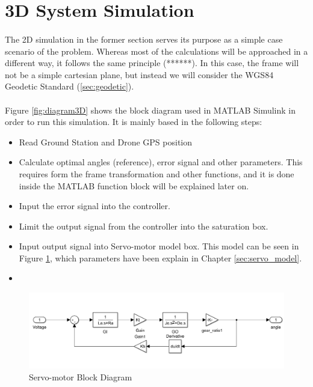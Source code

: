 \section{3D System Simulation}\label{sec:3d_sim}

\paragraph{}The 2D simulation in the former section serves its purpose as a simple case scenario of the problem. Whereas most of the calculations will be approached in a different way, it follows the same principle (******).
In this case, the frame will not be a simple cartesian plane, but instead we will consider the WGS84 Geodetic Standard (\ref{sec:geodetic}).


\paragraph{} Figure \ref{fig:diagram3D} shows the block diagram used in MATLAB Simulink in order to run this simulation. It is mainly based in the following steps:
\begin{itemize}
\item{Read Ground Station and Drone GPS position}
\item{Calculate optimal angles (reference), error signal and other parameters. This requires form the frame transformation and other functions, and it is done inside the MATLAB function block will be explained later on.}
\item{Input the error signal into the controller.}
\item{Limit the output signal from the controller into the saturation box.}
\item{Input output signal into Servo-motor model box. This model can be seen in Figure \ref{fig:servomotor3D}, which parameters have been explain in Chapter \ref{sec:servo_model}.}
\item{}
\end{itemize}

\begin{figure}[h]
	\centering
	\includegraphics[width=1.1\textwidth]{figures/servomotor_3D.png}
	\caption{Servo-motor Block Diagram}
   	\label{fig:servomotor3D}
\end{figure}

